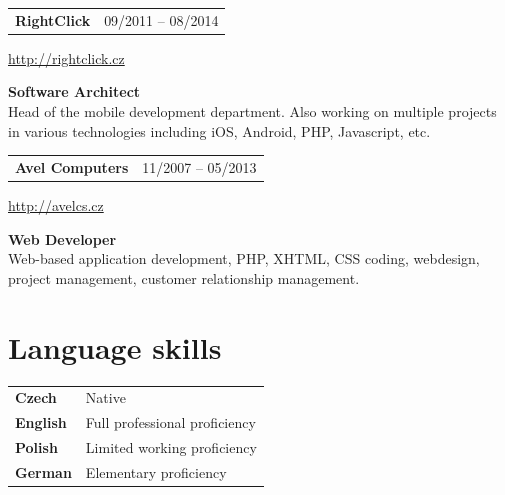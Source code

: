 \documentclass[10pt]{article} %
\begin{document}
\begin{minipage}[t]{0.44\textwidth}

\begin{tabularx}{\textwidth}{@{}Xr@{}}
\large\textbf{RightClick} & \small\textsc{09/2011 -- 08/2014} \\
\end{tabularx}
\normalsize\url{http://rightclick.cz}

\medskip
\normalsize\textbf{Software Architect}\\
\normalsize {Head of the mobile development department. \newline Also working on multiple projects in various technologies including iOS, Android, PHP, Javascript, etc.}\\
\medskip 


\begin{tabularx}{\textwidth}{@{}Xr@{}}
\large\textbf{Avel Computers} & \small\textsc{11/2007 -- 05/2013} \\
\end{tabularx}
\normalsize\url{http://avelcs.cz}

\medskip
\normalsize\textbf{Web Developer}\\
\normalsize {Web-based application development, PHP, XHTML, CSS coding, webdesign, project management, customer relationship management.}\\
\medskip 



\section{Language skills} 

\medskip 
\begin{tabular}{@{}ll}
\small\textbf{Czech} & Native\\
\small\textbf{English} & Full professional proficiency\\
\small\textbf{Polish} & Limited working proficiency\\
\small\textbf{German} & Elementary proficiency\\
\end{tabular}
\medskip

\end{minipage} %
\end{document}
